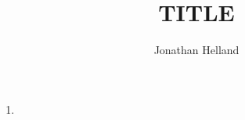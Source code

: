 \documentclass[letterpaper,10pt]{article}
\title{\bf TITLE}
\author{Jonathan Helland}
\date{}
\begin{document}
\maketitle

\begin{enumerate}
  \item 
\end{enumerate}
\end{document}
